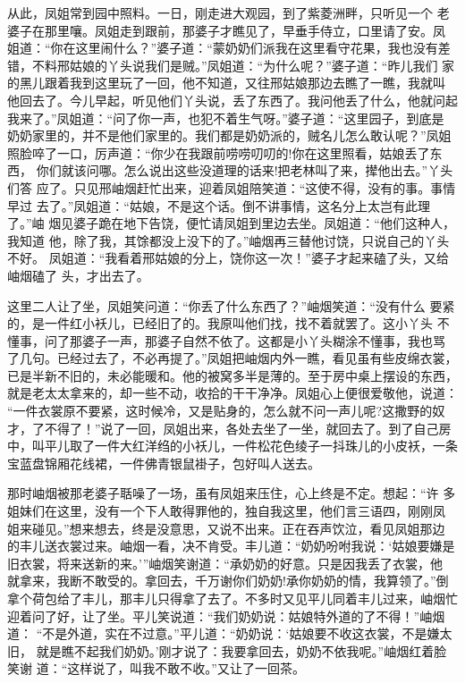 从此，凤姐常到园中照料。一日，刚走进大观园，到了紫菱洲畔，只听见一个
老婆子在那里嚷。凤姐走到跟前，那婆子才瞧见了，早垂手侍立，口里请了安。凤
姐道：“你在这里闹什么？”婆子道：“蒙奶奶们派我在这里看守花果，我也没有差
错，不料邢姑娘的丫头说我们是贼。”凤姐道：“为什么呢？”婆子道：“昨儿我们
家的黑儿跟着我到这里玩了一回，他不知道，又往邢姑娘那边去瞧了一瞧，我就叫
他回去了。今儿早起，听见他们丫头说，丢了东西了。我问他丢了什么，他就问起
我来了。”凤姐道：“问了你一声，也犯不着生气呀。”婆子道：“这里园子，到底是
奶奶家里的，并不是他们家里的。我们都是奶奶派的，贼名儿怎么敢认呢？”凤姐
照脸啐了一口，厉声道：“你少在我跟前唠唠叨叨的!你在这里照看，姑娘丢了东西，
你们就该问哪。怎么说出这些没道理的话来!把老林叫了来，撵他出去。”丫头们答
应了。只见邢岫烟赶忙出来，迎着凤姐陪笑道：“这使不得，没有的事。事情早过
去了。”凤姐道：“姑娘，不是这个话。倒不讲事情，这名分上太岂有此理了。”岫
烟见婆子跪在地下告饶，便忙请凤姐到里边去坐。凤姐道：“他们这种人，我知道
他，除了我，其馀都没上没下的了。”岫烟再三替他讨饶，只说自己的丫头不好。
凤姐道：“我看着邢姑娘的分上，饶你这一次！”婆子才起来磕了头，又给岫烟磕了
头，才出去了。

这里二人让了坐，凤姐笑问道：“你丢了什么东西了？”岫烟笑道：“没有什么
要紧的，是一件红小袄儿，已经旧了的。我原叫他们找，找不着就罢了。这小丫头
不懂事，问了那婆子一声，那婆子自然不依了。这都是小丫头糊涂不懂事，我也骂
了几句。已经过去了，不必再提了。”凤姐把岫烟内外一瞧，看见虽有些皮绵衣裳，
已是半新不旧的，未必能暖和。他的被窝多半是薄的。至于房中桌上摆设的东西，
就是老太太拿来的，却一些不动，收拾的干干净净。凤姐心上便很爱敬他，说道：
“一件衣裳原不要紧，这时候冷，又是贴身的，怎么就不问一声儿呢?这撒野的奴
才，了不得了！”说了一回，凤姐出来，各处去坐了一坐，就回去了。到了自己房
中，叫平儿取了一件大红洋绉的小袄儿，一件松花色绫子一抖珠儿的小皮袄，一条
宝蓝盘锦厢花线裙，一件佛青银鼠褂子，包好叫人送去。

那时岫烟被那老婆子聒噪了一场，虽有凤姐来压住，心上终是不定。想起：“许
多姐妹们在这里，没有一个下人敢得罪他的，独自我这里，他们言三语四，刚刚凤
姐来碰见。”想来想去，终是没意思，又说不出来。正在吞声饮泣，看见凤姐那边
的丰儿送衣裳过来。岫烟一看，决不肯受。丰儿道：“奶奶吩咐我说：‘姑娘要嫌是
旧衣裳，将来送新的来。’”岫烟笑谢道：“承奶奶的好意。只是因我丢了衣裳，他
就拿来，我断不敢受的。拿回去，千万谢你们奶奶!承你奶奶的情，我算领了。”倒
拿个荷包给了丰儿，那丰儿只得拿了去了。不多时又见平儿同着丰儿过来，岫烟忙
迎着问了好，让了坐。平儿笑说道：“我们奶奶说：姑娘特外道的了不得！”岫烟道：
“不是外道，实在不过意。”平儿道：“奶奶说：‘姑娘要不收这衣裳，不是嫌太旧，
就是瞧不起我们奶奶。’刚才说了：我要拿回去，奶奶不依我呢。”岫烟红着脸笑谢
道：“这样说了，叫我不敢不收。”又让了一回茶。

